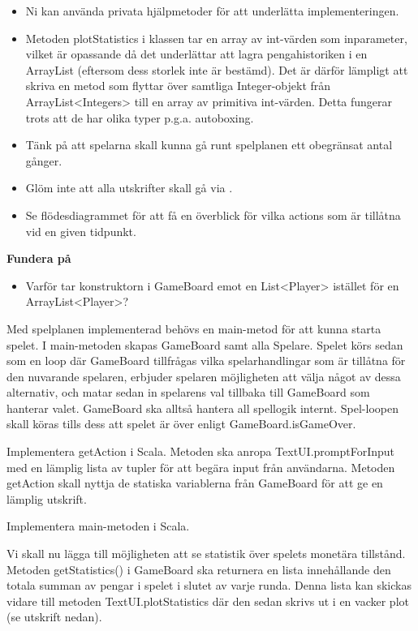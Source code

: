 \begin{itemize}
\item Ni kan använda privata hjälpmetoder för att underlätta implementeringen.
\item Metoden plotStatistics i klassen  tar en array av int-värden som inparameter, vilket är opassande då det underlättar att lagra pengahistoriken i en ArrayList (eftersom dess storlek inte är bestämd). Det är därför lämpligt att skriva en metod som flyttar över samtliga Integer-objekt från ArrayList<Integers> till en array av primitiva int-värden. Detta fungerar trots att de har olika typer p.g.a. autoboxing. 
\item Tänk på att spelarna skall kunna gå runt spelplanen ett obegränsat antal gånger.
\item Glöm inte att alla utskrifter skall gå via  .
\item Se flödesdiagrammet för att få en överblick för vilka actions som är tillåtna vid en given tidpunkt.
\end{itemize}

\textbf{Fundera på}
\begin{itemize}
\item Varför tar konstruktorn i GameBoard emot en List<Player> istället för en ArrayList<Player>?
\end{itemize}

\Task Med spelplanen implementerad behövs en main-metod för att kunna starta spelet. I main-metoden skapas GameBoard samt alla Spelare. Spelet körs sedan som en loop där GameBoard tillfrågas vilka spelarhandlingar som är tillåtna för den nuvarande spelaren, erbjuder spelaren möjligheten att välja något av dessa alternativ, och matar sedan in spelarens val tillbaka till GameBoard som hanterar valet. GameBoard ska alltså hantera all spellogik internt.  Spel-loopen skall köras tills dess att spelet är över enligt GameBoard.isGameOver. 

\Subtask Implementera getAction i Scala. Metoden ska anropa TextUI.promptForInput med en lämplig lista av tupler för att begära input från användarna. Metoden getAction skall nyttja de statiska variablerna från GameBoard för att ge en lämplig utskrift.

\Subtask Implementera main-metoden i Scala.

\Task Vi skall nu lägga till möjligheten att se statistik över spelets monetära tillstånd. Metoden getStatistics() i GameBoard  ska returnera en lista innehållande den totala summan av pengar i spelet i slutet av varje runda. Denna lista kan skickas vidare till metoden TextUI.plotStatistics där den sedan skrivs ut i en vacker plot (se utskrift nedan). 

